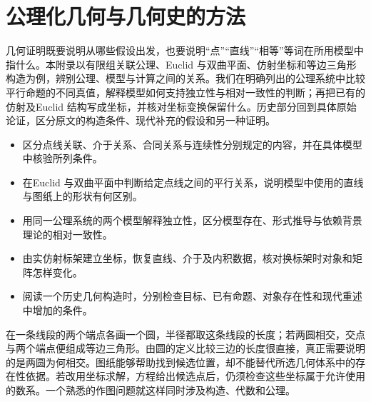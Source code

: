 
% 
% 
% 
% 
% 

\chapter{公理化几何与几何史的方法}
\label{g1:app:A}

\begin{chapterabstract}
	几何证明既要说明从哪些假设出发，也要说明“点”“直线”“相等”等词在所用模型中指什么。本附录以有限组关联公理、Euclid 与双曲平面、仿射坐标和等边三角形构造为例，辨别公理、模型与计算之间的关系。我们在明确列出的公理系统中比较平行命题的不同真值，解释模型如何支持独立性与相对一致性的判断；再把已有的仿射及Euclid 结构写成坐标，并核对坐标变换保留什么。历史部分回到具体原始论证，区分原文的构造条件、现代补充的假设和另一种证明。
\end{chapterabstract}

\begin{learninggoals}
	\begin{itemize}
		\item 区分点线关联、介于关系、合同关系与连续性分别规定的内容，并在具体模型中核验所列条件。
		\item 在Euclid 与双曲平面中判断给定点线之间的平行关系，说明模型中使用的直线与图纸上的形状有何区别。
		\item 用同一公理系统的两个模型解释独立性，区分模型存在、形式推导与依赖背景理论的相对一致性。
		\item 由实仿射标架建立坐标，恢复直线、介于及内积数据，核对换标架时对象和矩阵怎样变化。
		\item 阅读一个历史几何构造时，分别检查目标、已有命题、对象存在性和现代重述中增加的条件。
	\end{itemize}
\end{learninggoals}

在一条线段的两个端点各画一个圆，半径都取这条线段的长度；若两圆相交，交点与两个端点便组成等边三角形。由圆的定义比较三边的长度很直接，真正需要说明的是两圆为何相交。图纸能够帮助找到候选位置，却不能替代所选几何体系中的存在性依据。若改用坐标求解，方程给出候选点后，仍须检查这些坐标属于允许使用的数系。一个熟悉的作图问题就这样同时涉及构造、代数和公理。

